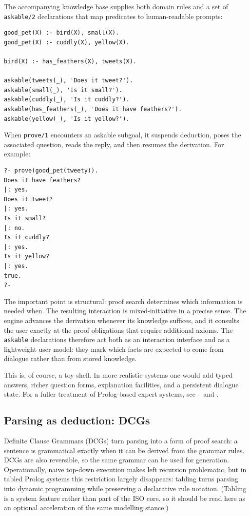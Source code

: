 \noindent The accompanying knowledge base supplies both domain rules and a set of \texttt{askable/2} declarations that map predicates to human-readable prompts:

\begin{verbatim}
good_pet(X) :- bird(X), small(X).
good_pet(X) :- cuddly(X), yellow(X).

bird(X) :- has_feathers(X), tweets(X).

askable(tweets(_), 'Does it tweet?').
askable(small(_), 'Is it small?').
askable(cuddly(_), 'Is it cuddly?').
askable(has_feathers(_), 'Does it have feathers?').
askable(yellow(_), 'Is it yellow?').
\end{verbatim}

\noindent When \texttt{prove/1} encounters an askable subgoal, it suspends deduction, poses the associated question, reads the reply, and then resumes the derivation. For example:

\begin{verbatim}
?- prove(good_pet(tweety)).
Does it have feathers?
|: yes.
Does it tweet?
|: yes.
Is it small?
|: no.
Is it cuddly?
|: yes.
Is it yellow?
|: yes.
true.
?-
\end{verbatim}

\noindent The important point is structural: proof search determines which information is needed when. The resulting interaction is mixed-initiative in a precise sense. The engine advances the derivation whenever its knowledge suffices, and it consults the user exactly at the proof obligations that require additional axioms. The \texttt{askable} declarations therefore act both as an interaction interface and as a lightweight user model: they mark which facts are expected to come from dialogue rather than from stored knowledge.

This is, of course, a toy shell. In more realistic systems one would add typed answers, richer question forms, explanation facilities, and a persistent dialogue state. For a fuller treatment of Prolog-based expert systems, see ~\cite{Merritt1989} and \cite{sterling1994art}.

\subsection{Parsing as deduction: DCGs}

Definite Clause Grammars (DCGs) turn parsing into a form of proof search: a sentence is grammatical exactly when it can be derived from the grammar rules. DCGs are also reversible, so the same grammar can be used for generation. Operationally, naive top-down execution makes left recursion problematic, but in tabled Prolog systems this restriction largely disappears: tabling turns parsing into dynamic programming while preserving a declarative rule notation. (Tabling is a system feature rather than part of the ISO core, so it should be read here as an optional acceleration of the same modelling stance.)

